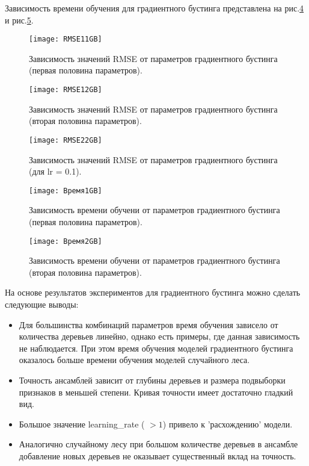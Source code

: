 \documentclass[12pt, a4paper]{article}
\begin{document}
Зависимость времени обучения для градиентного бустинга представлена на рис.\ref{TIME1GB} и рис.\ref{TIME2GB}.


\begin{figure}[H]
\centering
\texttt{[image: RMSE11GB]}
\caption{Зависимость значений RMSE от параметров градиентного бустинга (первая половина параметров).}
\label{RMSE11GB}
\end{figure}

\begin{figure}[H]
\centering
\texttt{[image: RMSE12GB]}
\caption{Зависимость значений RMSE от параметров градиентного бустинга (вторая половина параметров).}
\label{RMSE12GB}
\end{figure}

\begin{figure}[H]
\centering
\texttt{[image: RMSE22GB]}
\caption{Зависимость значений RMSE от параметров градиентного бустинга (для lr = 0.1).}
\label{RMSE2GB}
\end{figure}

\begin{figure}[H]
\centering
\texttt{[image: Время1GB]}
\caption{Зависимость  времени обучени от параметров градиентного бустинга (первая половина параметров).}
\label{TIME1GB}
\end{figure}

\begin{figure}[H]
\centering
\texttt{[image: Время2GB]}
\caption{Зависимость  времени обучени от параметров градиентного бустинга (вторая половина параметров).}
\label{TIME2GB}
\end{figure}

На основе результатов экспериментов для градиентного бустинга можно сделать следующие выводы:
\begin{itemize}
\item Для большинства комбинаций параметров время обучения зависело от количества деревьев линейно, однако есть примеры, где данная зависимость не наблюдается. При этом время обучения моделей градиентного бустинга оказалось больше времени обучения моделей случайного леса.
\item Точность ансамблей зависит от глубины деревьев и размера подвыборки признаков в меньшей степени. Кривая точности имеет достаточно гладкий вид. 
\item Большое значение learning\_rate ( $> 1$) привело к 'расхождению' модели.
\item Аналогично случайному лесу при большом количестве деревьев в ансамбле добавление новых деревьев не оказывает существенный вклад на точность.
\end{itemize}
\end{document}
